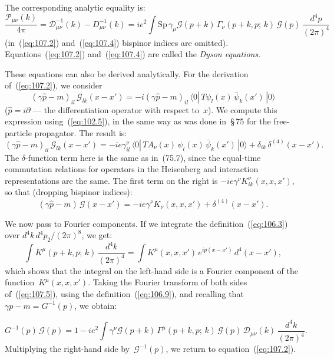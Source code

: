 The corresponding analytic equality is:
\begin{equation}
\frac{\mathcal{P}_{\mu\nu}(k)}{4\pi} = \mathcal{D}^{-1}_{\mu\nu}(k) - D^{-1}_{\mu\nu}(k) = ie^2 \int \mathrm{Sp}\,\gamma_\mu \mathcal{G}(p+k)\,\Gamma_\nu(p+k,p;\,k)\,\mathcal{G}(p)\,\frac{d^4p}{(2\pi)^4}
\label{eq:107.4}
\end{equation}
(in~(\ref{eq:107.2}) and~(\ref{eq:107.4}) bispinor indices are omitted). Equations~(\ref{eq:107.2}) and~(\ref{eq:107.4}) are called the \emph{Dyson equations}.


These equations can also be derived analytically. For the derivation of~(\ref{eq:107.2}), we consider
\begin{equation}
(\gamma\hat{p} - m)_{il}\,\mathcal{G}_{lk}(x - x') = -i(\gamma\hat{p} - m)_{il}\,\langle 0|\,T\psi_l(x)\,\bar{\psi}_k(x')\,|0\rangle
\label{eq:107.5a}
\end{equation}
($\hat{p} = i\partial$ --- the differentiation operator with respect to~$x$). We compute this expression using~(\ref{eq:102.5}), in the same way as was done in~\S\,75 for the free-particle propagator. The result is:
\begin{equation}
(\gamma\hat{p} - m)_{il}\,\mathcal{G}_{lk}(x - x') = -ie\gamma^\nu_{il}\,\langle 0|\,T A_\nu(x)\,\psi_l(x)\,\bar{\psi}_k(x')\,|0\rangle + \delta_{ik}\,\delta^{(4)}(x - x').
\label{eq:107.5b}
\end{equation}
The $\delta$-function term here is the same as in~(75.7), since the equal-time commutation relations for operators in the Heisenberg and interaction representations are the same. The first term on the right is $-ie\gamma^\nu K^\nu_{ik}(x, x, x')$, so that (dropping bispinor indices):
\begin{equation}
(\gamma\hat{p} - m)\,\mathcal{G}(x - x') = -ie\gamma^\nu K_\nu(x, x, x') + \delta^{(4)}(x - x').
\label{eq:107.5}
\end{equation}

We now pass to Fourier components. If we integrate the definition~(\ref{eq:106.3}) over $d^4k\,d^4p_2/(2\pi)^8$, we get:
\begin{equation}
\int K^\mu(p+k, p;\,k)\,\frac{d^4k}{(2\pi)^4} = \int K^\mu(x, x, x')\,e^{ip(x-x')}\,d^4(x - x'),
\label{eq:107.6}
\end{equation}
which shows that the integral on the left-hand side is a Fourier component of the function~$K^\mu(x, x, x')$. Taking the Fourier transform of both sides of~(\ref{eq:107.5}), using the definition~(\ref{eq:106.9}), and recalling that $\gamma p - m = G^{-1}(p)$, we obtain:


\begin{equation}
G^{-1}(p)\,\mathcal{G}(p) = 1 - ie^2 \int \gamma^\nu \mathcal{G}(p+k)\,\Gamma^\mu(p+k,p;\,k)\,\mathcal{G}(p)\,\mathcal{D}_{\mu\nu}(k)\,\frac{d^4k}{(2\pi)^4}.
\label{eq:107.7}
\end{equation}
Multiplying the right-hand side by~$\mathcal{G}^{-1}(p)$, we return to equation~(\ref{eq:107.2}).
